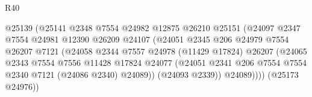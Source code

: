 \begin{lexlean}{R40}
\begin{coremodule}
                                          @25139
                                          (@25141
                                            @2348
                                            @7554
                                            @24982
                                            @12875
                                            @26210
                                            @25151
                                            (@24097
                                              @2347
                                              @7554
                                              @24981
                                              @12390
                                              @26209
                                              @24107
                                              (@24051
                                                @2345
                                                @206
                                                @24979
                                                @7554
                                                @26207
                                                @7121
                                                (@24058
                                                  @2344
                                                  @7557
                                                  @24978
                                                  (@11429 @17824)
                                                  @26207
                                                  (@24065
                                                    @2343
                                                    @7554
                                                    @7556
                                                    @11428
                                                    @17824
                                                    @24077
                                                    (@24051
                                                      @2341
                                                      @206
                                                      @7554
                                                      @7554
                                                      @2340
                                                      @7121
                                                      (@24086 @2340)
                                                      @24089))
                                                  (@24093 @2339))
                                                @24089))))
                                        (@25173 @24976))

\end{coremodule}
\end{lexlean}

